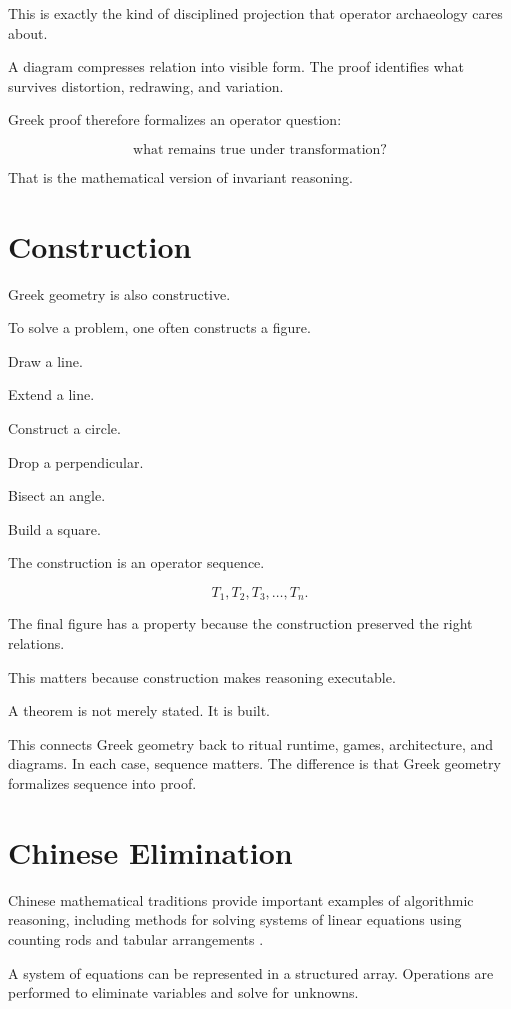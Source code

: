 \documentclass[11pt]{book}
\begin{document}
This is exactly the kind of disciplined projection that operator archaeology cares about.

A diagram compresses relation into visible form. The proof identifies what survives distortion, redrawing, and variation.

Greek proof therefore formalizes an operator question:

\[
\text{what remains true under transformation?}
\]

That is the mathematical version of invariant reasoning.

\section{Construction}

Greek geometry is also constructive.

To solve a problem, one often constructs a figure.

Draw a line.

Extend a line.

Construct a circle.

Drop a perpendicular.

Bisect an angle.

Build a square.

The construction is an operator sequence.

\[
T_1, T_2, T_3, \ldots, T_n.
\]

The final figure has a property because the construction preserved the right relations.

This matters because construction makes reasoning executable.

A theorem is not merely stated. It is built.

This connects Greek geometry back to ritual runtime, games, architecture, and diagrams. In each case, sequence matters. The difference is that Greek geometry formalizes sequence into proof.

\section{Chinese Elimination}

Chinese mathematical traditions provide important examples of algorithmic reasoning, including methods for solving systems of linear equations using counting rods and tabular arrangements \cite{Needham1959ScienceCivilisationChina3}.

A system of equations can be represented in a structured array. Operations are performed to eliminate variables and solve for unknowns.
\end{document}
